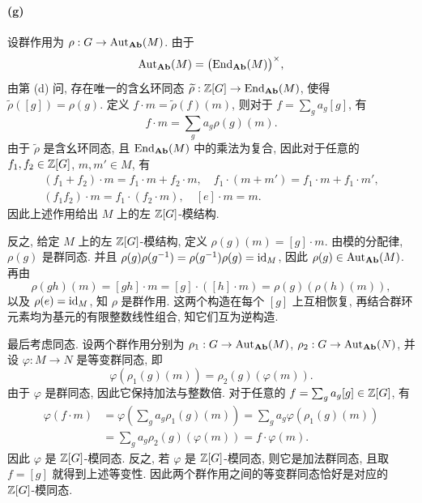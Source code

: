 \documentclass{article}
\begin{document}
\begin{solution}
	\paragraph{(g)} 设群作用为 $\rho: G \to \operatorname{Aut}_{\mathbf{Ab}}(M)$. 由于
	\[ \operatorname{Aut}_{\mathbf{Ab}}(M) = \bigl(\operatorname{End}_{\mathbf{Ab}}(M)\bigr)^\times, \]
	由第 (d) 问, 存在唯一的含幺环同态 $\widetilde{\rho}: \mathbb{Z}[G] \to \operatorname{End}_{\mathbf{Ab}}(M)$, 使得 $\widetilde{\rho}([g]) = \rho(g)$. 定义 $f \cdot m = \widetilde{\rho}(f)(m)$, 则对于 $f = \sum_g a_g[g]$, 有
	\[ f \cdot m = \sum_g a_g\rho(g)(m). \]
	由于 $\widetilde{\rho}$ 是含幺环同态, 且 $\operatorname{End}_{\mathbf{Ab}}(M)$ 中的乘法为复合, 因此对于任意的 $f_1, f_2 \in \mathbb{Z}[G]$, $m, m' \in M$, 有
	\begin{gather*}
		(f_1 + f_2)\cdot m = f_1\cdot m + f_2\cdot m,\quad
		f_1\cdot(m + m') = f_1\cdot m + f_1\cdot m', \\
		(f_1f_2)\cdot m = f_1\cdot(f_2\cdot m),\quad [e]\cdot m = m.
	\end{gather*}
	因此上述作用给出 $M$ 上的左 $\mathbb{Z}[G]$-模结构.

	反之, 给定 $M$ 上的左 $\mathbb{Z}[G]$-模结构, 定义 $\rho(g)(m) = [g]\cdot m$. 由模的分配律, $\rho(g)$ 是群同态. 并且 $\rho(g)\rho(g^{-1}) = \rho(g^{-1})\rho(g) = \operatorname{id}_M$, 因此 $\rho(g) \in \operatorname{Aut}_{\mathbf{Ab}}(M)$. 再由
	\[ \rho(gh)(m) = [gh]\cdot m = [g]\cdot([h]\cdot m) = \rho(g)(\rho(h)(m)), \]
	以及 $\rho(e) = \operatorname{id}_M$, 知 $\rho$ 是群作用. 这两个构造在每个 $[g]$ 上互相恢复, 再结合群环元素均为基元的有限整数线性组合, 知它们互为逆构造.

	最后考虑同态. 设两个群作用分别为 $\rho_1: G \to \operatorname{Aut}_{\mathbf{Ab}}(M)$, $\rho_2: G \to \operatorname{Aut}_{\mathbf{Ab}}(N)$, 并设 $\varphi: M \to N$ 是等变群同态, 即
	\[ \varphi(\rho_1(g)(m)) = \rho_2(g)(\varphi(m)). \]
	由于 $\varphi$ 是群同态, 因此它保持加法与整数倍. 对于任意的 $f = \sum_g a_g[g] \in \mathbb{Z}[G]$, 有
	\begin{align*}
		\varphi(f\cdot m)
		&= \varphi\left(\sum_g a_g\rho_1(g)(m)\right)
		= \sum_g a_g\varphi(\rho_1(g)(m)) \\
		&= \sum_g a_g\rho_2(g)(\varphi(m))
		= f\cdot\varphi(m).
	\end{align*}
	因此 $\varphi$ 是 $\mathbb{Z}[G]$-模同态. 反之, 若 $\varphi$ 是 $\mathbb{Z}[G]$-模同态, 则它是加法群同态, 且取 $f = [g]$ 就得到上述等变性. 因此两个群作用之间的等变群同态恰好是对应的 $\mathbb{Z}[G]$-模同态.
\end{solution}
\end{document}
